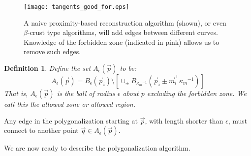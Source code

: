 \documentclass{article}
\newtheorem{definition}[cntr]{Definition}
\numberwithin{cntr}{section}
\numberwithin{equation}{section}
\newcommand{\vp}[0]{{\vec{p}}}
\newcommand{\vq}[0]{{\vec{q}}}
\newcommand{\vm}[0]{{\vec{m}}}
\newcommand{\ball}[2]{ { B_{#1}(#2) } }
\newcommand{\allowed}[2]{ { A_{#1}(#2) } }
\newcommand{\curvemax}{{\kappa_{m}}}
\newcommand{\curvemaxi}{{\curvemax^{-1}}}
\begin{document}
\begin{figure}
\setlength{\unitlength}{0.240900pt}
\ifx\plotpoint\undefined\newsavebox{\plotpoint}\fi
\sbox{\plotpoint}{\rule[-0.200pt]{0.400pt}{0.400pt}}%
\texttt{[image: tangents\_good\_for.eps]}

\caption{A naive proximity-based reconstruction algorithm (shown), or even $\beta$-crust type algorithms, will add edges between different curves. Knowledge of the forbidden zone (indicated in pink) allows us to remove such edges.}
\label{fig:proximityVsTangentBased}
\end{figure}

\begin{definition}
  \label{def:AllowedRegion}
  Define the set $\allowed{\epsilon}{\vp}$ to be:
  \begin{equation}
    \label{eq:allowedRegion}
    \allowed{\epsilon}{\vp}=\ball{\epsilon}{\vp_{i}} \setminus \left[ \cup_{\pm} \ball{\curvemaxi}{\vp_{i} \pm \vm_{i}^{\perp} \curvemaxi} \right]
  \end{equation}
  That is, $\allowed{\epsilon}{\vp}$ is the ball of radius $\epsilon$ about $p$ excluding the forbidden zone.  We call this the \emph{allowed zone} or \emph{allowed region}.
\end{definition}
Any edge in the polygonalization starting at $\vp$, with length shorter than $\epsilon$, must connect to another point $\vq \in \allowed{\epsilon}{\vp}$.

We are now ready to describe the polygonalization algorithm.
\end{document}
